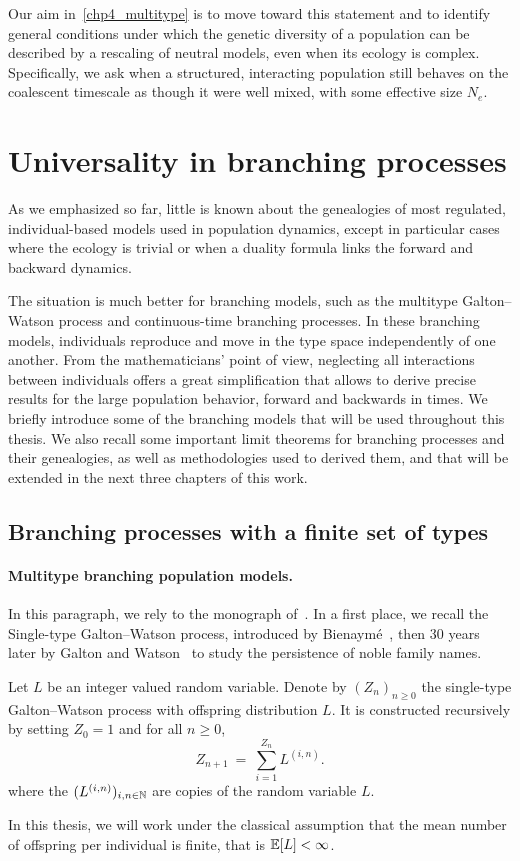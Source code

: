 Our aim in~\ref{chp4_multitype} is to move toward this statement and to identify general conditions under which the genetic diversity of a population can be described by a rescaling of neutral models, even when its ecology is complex. Specifically, we ask when a structured, interacting population still behaves on the coalescent timescale as though it were well mixed, with some effective size $N_e$.



\section{Universality in branching processes}
As we emphasized so far, little is known about the genealogies of most regulated, individual-based models used in population dynamics, except in particular cases where the ecology is trivial or when a duality formula links the forward and backward dynamics.

The situation is much better for branching models, such as the multitype Galton--Watson process and continuous-time branching processes. In these branching models, individuals reproduce and move in the type space independently of one another. From the mathematicians' point of view, neglecting all interactions between individuals offers a great simplification that allows to derive precise results for the large population behavior, forward and backwards in times. We briefly introduce some of the branching models that will be used throughout this thesis. We also recall some important limit theorems for branching processes and their genealogies, as well as  methodologies used to derived them, and that will be extended in the next three chapters of this work. 

\subsection{Branching processes with a finite set of types}
\paragraph{Multitype branching population models.}
In this paragraph, we rely to the monograph of~\citet*{athreya_branching_1972}.  In a first place, we recall the Single-type Galton--Watson process, introduced by Bienaymé~\cite{Bienayme1845, heyde_studies_1972}, then 30 years later by Galton and Watson~\cite{watson_probability_1875} to study the persistence of noble family names.
\begin{defn}
    Let $L$ be an integer valued random variable.
    Denote by $(Z_n)_{n\geq 0}$ the single-type Galton--Watson process with offspring distribution $L$. It is constructed recursively by setting $Z_0=1$ and for all $n\geq 0$,
    \[  
    Z_{n+1}\ =\ \sum_{i=1}^{Z_n} L^{(i,n)}.
    \]
    where the $(L^{(i,n)})_{i, n\in \operatorname{\mathbb{N}}}$ are \iid copies of the random variable $L$. 
\end{defn}
In this thesis, we will work under the classical assumption that the mean number of offspring per individual is finite, that is $\operatorname{\mathbb{E}}[L]<\infty$.

